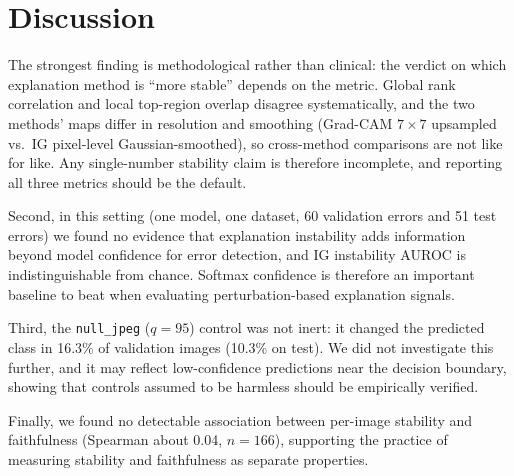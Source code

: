 \documentclass[conference]{IEEEtran}
\begin{document}
\section{Discussion}

The strongest finding is methodological rather than clinical: the verdict on
which explanation method is ``more stable'' depends on the metric. Global
rank correlation and local top-region overlap disagree systematically, and
the two methods' maps differ in resolution and smoothing (Grad-CAM $7\times7$
upsampled vs.\ IG pixel-level Gaussian-smoothed), so cross-method comparisons
are not like for like. Any single-number stability claim is therefore
incomplete, and reporting all three metrics should be the default.

Second, in this setting (one model, one dataset, 60 validation errors and 51
test errors) we found no evidence that explanation instability adds
information beyond model confidence for error detection, and IG instability
AUROC is indistinguishable from chance. Softmax confidence is therefore an
important baseline to beat when evaluating perturbation-based explanation
signals.

Third, the \texttt{null\_jpeg} ($q{=}95$) control was not inert: it changed
the predicted class in 16.3\% of validation images (10.3\% on test). We did
not investigate this further, and it may reflect low-confidence predictions
near the decision boundary, showing that controls assumed to be harmless
should be empirically verified.

Finally, we found no detectable association between per-image stability and
faithfulness (Spearman about 0.04, $n{=}166$), supporting the practice of
measuring stability and faithfulness as separate properties.
\end{document}
